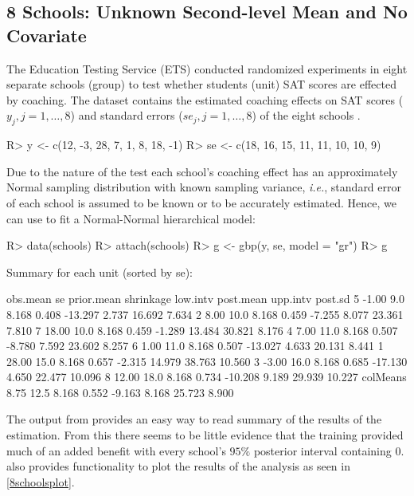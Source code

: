 \documentclass[article]{jss}
\begin{document}
\subsection[Unknown Second-level Mean and No Covariate]{8 Schools: Unknown Second-level Mean and No Covariate}

The Education Testing Service (ETS) conducted randomized experiments in eight separate schools (group) to test whether students (unit) SAT scores are effected by coaching. The dataset contains the estimated coaching effects on SAT scores ($y_{j}, j=1, \ldots, 8$) and standard errors ($se_{j}, j=1, \ldots, 8$) of the eight schools \citep{1981}.
\begin{CodeChunk}
\begin{CodeInput}
R> y  <- c(12, -3, 28,  7,  1,  8, 18, -1)
R> se <- c(18, 16, 15, 11, 11, 10, 10,  9)
\end{CodeInput}
\end{CodeChunk}

Due to the nature of the test each school's coaching effect has an approximately Normal sampling distribution with known sampling variance, \emph{i.e.}, standard error of each school is assumed to be known or to be accurately estimated. Hence, we can use  to fit a Normal-Normal hierarchical model:


\begin{CodeChunk}
\begin{CodeInput}
R> data(schools)
R> attach(schools)
R> g <- gbp(y, se, model = "gr")
R> g
\end{CodeInput}
\begin{CodeOutput}
Summary for each unit (sorted by se):

         obs.mean   se prior.mean shrinkage low.intv post.mean upp.intv post.sd
5           -1.00  9.0      8.168     0.408  -13.297     2.737   16.692   7.634
2            8.00 10.0      8.168     0.459   -7.255     8.077   23.361   7.810
7           18.00 10.0      8.168     0.459   -1.289    13.484   30.821   8.176
4            7.00 11.0      8.168     0.507   -8.780     7.592   23.602   8.257
6            1.00 11.0      8.168     0.507  -13.027     4.633   20.131   8.441
1           28.00 15.0      8.168     0.657   -2.315    14.979   38.763  10.560
3           -3.00 16.0      8.168     0.685  -17.130     4.650   22.477  10.096
8           12.00 18.0      8.168     0.734  -10.208     9.189   29.939  10.227
colMeans     8.75 12.5      8.168     0.552   -9.163     8.168   25.723   8.900
\end{CodeOutput}
\end{CodeChunk}
The output from  provides an easy way to read summary of the results of the estimation. From this there seems to be little evidence that the training provided much of an added benefit with every school's $95\%$ posterior interval containing 0.  also provides functionality to plot the results of the analysis as seen in \ref{8schoolsplot}.
\end{document}
